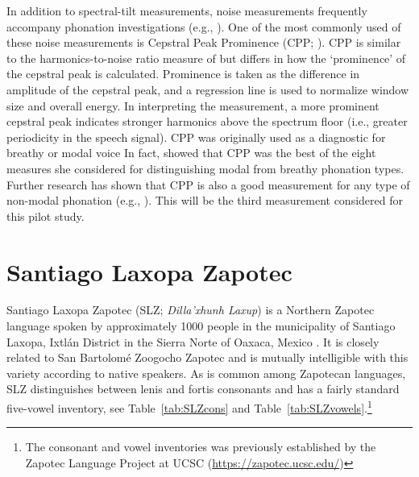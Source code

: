 \documentclass[12pt, letterpaper]{article}
\begin{document}
In addition to spectral-tilt measurements, noise measurements frequently accompany phonation investigations (e.g., \cite{garellekPhoneticsWhiteHmong2021}). One of the most commonly used of these noise measurements is Cepstral Peak Prominence (CPP; \cite{hillenbrandAcousticCorrelatesBreathy1994,hillenbrandAcousticCorrelatesBreathy1996}). CPP is similar to the harmonics-to-noise ratio measure of \citet{dekromCepstrumBasedTechniqueDetermining1993} but differs in how the ‘prominence’ of the cepstral peak is calculated. Prominence is taken as the difference in amplitude of the cepstral peak, and a regression line is used to normalize window size and overall energy. In interpreting the measurement, a more prominent cepstral peak indicates stronger harmonics above the spectrum floor (i.e., greater periodicity in the speech signal). CPP was originally used as a diagnostic for breathy or modal voice \citep{blankenshipTimingNonmodalPhonation2002,espositoVariationContrastivePhonation2010} In fact, \citeauthor{espositoEffectsLinguisticExperience2010} showed that CPP was the best of the eight measures she considered for distinguishing modal from breathy phonation types. Further research has shown that CPP is also a good measurement for any type of non-modal phonation (e.g., \cite{andruskiPhonationTypesProduction2000,andruskiToneClarityMixed2006,blankenshipTimingNonmodalPhonation2002,waylandAcousticCorrelatesBreathy2003,avelinoAcousticElectroglottographicAnalyses2010}). This will be the third measurement considered for this pilot study. 

\section{Santiago Laxopa Zapotec} \label{sec:SLZ}

Santiago Laxopa Zapotec (SLZ; \textit{Dilla'xhunh Laxup}) is a Northern Zapotec language spoken by approximately 1000 people in the municipality of Santiago Laxopa, Ixtlán District in the Sierra Norte of Oaxaca, Mexico \citep{adlerAcousticsPhonationTypes2016,adlerDerivationVerbInitiality2018,foleyForbiddenCliticClusters2018,foleyExtendingPersonCaseConstraint2020}. It is closely related to San Bartolomé Zoogocho Zapotec \citep{longDiccionarioZapotecoSan2005,sonnenscheinDescriptiveGrammarSan2005} and is mutually intelligible with this variety according to native speakers.  As is common among Zapotecan languages, SLZ distinguishes between lenis and fortis consonants \citep[e.g.,][]{nellisFortisLenisCajonos1980,jaegerFortisLenisQuestion1983,uchiharaFortisLenisGlides2016} and has a fairly standard five-vowel inventory, see Table~\ref{tab:SLZcons} and Table~\ref{tab:SLZvowels}.\footnote{The consonant and vowel inventories was previously established by the Zapotec Language Project at UCSC (\url{https://zapotec.ucsc.edu/}) }
\end{document}
